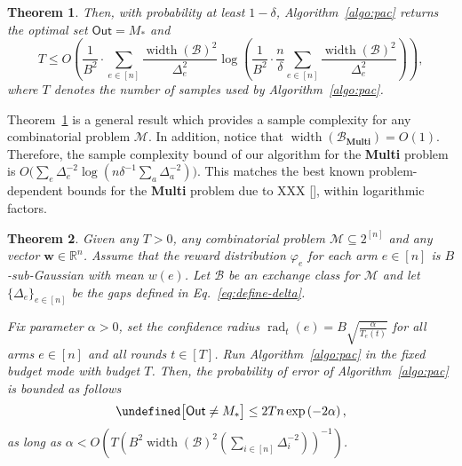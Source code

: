 \documentclass{article}
\newtheorem{theorem}{Theorem}
\newcommand{\Rew}{\varphi}
\newcommand{\M}{\mathcal M}
\newcommand{\B}{\mathcal B}
\newcommand{\RR}{\mathbb R}
\DeclareMathOperator{\rank}{width}
\DeclareMathOperator{\rad}{rad}
\newcommand{\out}{\mathsf{Out}}
\let\Pr\undefined
\DeclareMathOperator{\Pr}{Pr}
\newcommand{\MultiIdent}{\textbf{Multi}\xspace}
\renewcommand{\vec}[1]{\boldsymbol{#1}}
\begin{document}
\begin{spacing}{1.1}
\begin{theorem}
Then, with probability at least $1-\delta$, Algorithm~\ref{algo:pac} returns the optimal set $\out=M_*$ and
$$
T \le O\left(\frac{1}{B^2}\cdot \sum_{e\in [n]} \frac{\rank(\B)^2}{\Delta_e^2} \log\left(\frac{1}{B^2}\cdot \frac{n}{\delta} \sum_{e\in[n]}\frac{\rank(\B)^2}{\Delta_e^2} \right)\right),
$$
where $T$ denotes the number of samples used by Algorithm~\ref{algo:pac}.
\label{theorem:main}
\end{theorem}
Theorem~\ref{theorem:main} is a general result which provides a sample complexity for any combinatorial problem $\M$.
In addition, notice that $\rank(\B_{\MultiIdent})=O(1)$.
Therefore, the sample complexity bound of our algorithm for the \MultiIdent problem is $O\big(\sum_e \Delta_e^{-2}\log(n\delta^{-1}\sum_{a}\Delta_a^{-2})\big)$.
This matches the best known problem-dependent bounds for the \MultiIdent problem due to XXX [], within logarithmic factors.


\begin{theorem}
Given any $T>0$, any combinatorial problem $\M \subseteq 2^{[n]}$ and any vector $\vec w \in \RR^{n}$.
Assume that the reward distribution $\Rew_e$ for each arm $e\in [n]$ is  $B$-sub-Gaussian with mean $w(e)$.
Let $\B$ be an exchange class for $\M$ and let $\{\Delta_e\}_{e\in [n]}$ be the gaps defined in Eq.~\eqref{eq:define-delta}.

Fix parameter $\alpha > 0$, set the confidence radius $\rad_t(e) = B\sqrt{\frac{\alpha}{T_e(t)}}$ for all arms $e\in[n]$ and all rounds $t\in [T]$.
Run Algorithm~\ref{algo:pac} in the fixed budget mode with budget $T$.
Then, the probability of error of Algorithm~\ref{algo:pac} is bounded as follows
$$
\Pr\big[\out\not=M_*\big] \le 2Tn\exp\left(-2\alpha\right),
$$
as long as $\alpha < O\left(T\left(B^2\rank(\B)^2\left(\sum_{i\in[n]}\Delta_i^{-2}\right)\right)^{-1}\right)$.

\label{theorem:main-budget}
\end{theorem}









\end{spacing}
\end{document}
